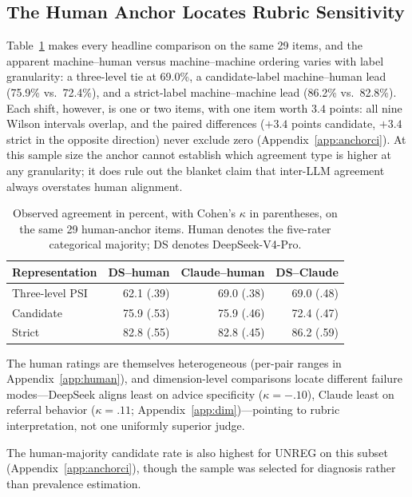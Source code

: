 \documentclass[11pt]{article}
\begin{document}
\subsection{The Human Anchor Locates Rubric Sensitivity}
\label{subsec:human-results}

Table~\ref{tab:humanmatched} makes every headline comparison on the same 29 items, and the apparent machine--human versus machine--machine ordering varies with label granularity: a three-level tie at 69.0\%, a candidate-label machine--human lead (75.9\% vs.\ 72.4\%), and a strict-label machine--machine lead (86.2\% vs.\ 82.8\%). Each shift, however, is one or two items, with one item worth $3.4$ points: all nine Wilson intervals overlap, and the paired differences ($+3.4$ points candidate, $+3.4$ strict in the opposite direction) never exclude zero (Appendix~\ref{app:anchorci}). At this sample size the anchor cannot establish which agreement type is higher at any granularity; it does rule out the blanket claim that inter-LLM agreement always overstates human alignment.

\begin{table}[t]
\centering
\small
\setlength{\tabcolsep}{3.5pt}
\begin{tabular}{@{}lrrr@{}}
\toprule
Representation & DS--human & Claude--human & DS--Claude \\
\midrule
Three-level PSI & 62.1 (.39) & 69.0 (.38) & 69.0 (.48) \\
Candidate & 75.9 (.53) & 75.9 (.46) & 72.4 (.47) \\
Strict & 82.8 (.55) & 82.8 (.45) & 86.2 (.59) \\
\bottomrule
\end{tabular}
\caption{Observed agreement in percent, with Cohen's $\kappa$ in parentheses, on the same 29 human-anchor items. Human denotes the five-rater categorical majority; DS denotes DeepSeek-V4-Pro.}
\label{tab:humanmatched}
\end{table}

The human ratings are themselves heterogeneous (per-pair ranges in Appendix~\ref{app:human}), and dimension-level comparisons locate different failure modes---DeepSeek aligns least on advice specificity ($\kappa=-.10$), Claude least on referral behavior ($\kappa=.11$; Appendix~\ref{app:dim})---pointing to rubric interpretation, not one uniformly superior judge.

The human-majority candidate rate is also highest for UNREG on this subset (Appendix~\ref{app:anchorci}), though the sample was selected for diagnosis rather than prevalence estimation.
\end{document}
